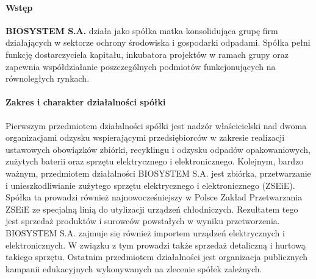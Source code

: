 

\paragraph{Wstęp}
\textbf{BIOSYSTEM S.A.} działa jako spółka matka konsolidująca grupę firm działających w sektorze ochrony środowiska i gospodarki odpadami. Spółka pełni funkcję dostarczyciela kapitału, inkubatora projektów w ramach grupy oraz zapewnia współdziałanie poszczególnych podmiotów funkcjonujących na równoległych rynkach.

\paragraph{Zakres i charakter działalności spółki}

Pierwszym przedmiotem działalności spółki jest nadzór właścicielski nad dwoma organizacjami odzysku wspierającymi przedsiębiorców w zakresie realizacji ustawowych obowiązków zbiórki, recyklingu i odzysku odpadów opakowaniowych, zużytych baterii oraz sprzętu elektrycznego i elektronicznego.
Kolejnym, bardzo ważnym, przedmiotem działalności BIOSYSTEM S.A. jest zbiórka, przetwarzanie i unieszkodliwianie zużytego sprzętu elektrycznego i elektronicznego (ZSEiE). Spółka ta prowadzi również najnowocześniejszy w Polsce Zakład Przetwarzania ZSEiE ze specjalną linią do utylizacji urządzeń chłodniczych. Rezultatem tego jest sprzedaż produktów i surowców powstałych w wyniku przetworzenia.
BIOSYSTEM S.A. zajmuje się również importem urządzeń elektrycznych i elektronicznych. W związku z tym prowadzi także sprzedaż detaliczną i hurtową takiego sprzętu.
Ostatnim przedmiotem działalności jest organizacja publicznych kampanii edukacyjnych wykonywanych na zlecenie spółek zależnych.